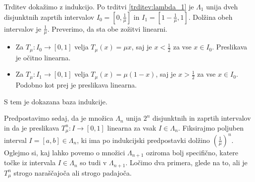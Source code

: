 \documentclass{isrmdelo}
\begin{document}
\begin{dokaz}
Trditev dokažimo z indukcijo. Po trditvi \ref{trditev:lambda_1} je $\Lambda_1$ unija dveh disjunktnih zaprtih intervalov $I_0 = [0, \frac{1}{\mu}]$ in $I_1 = [1-\frac{1}{\mu}, 1]$. Dolžina obeh intervalov je $\frac{1}{\mu}$. Preverimo, da sta obe zožitvi linearni.
\begin{itemize}
    \item Za $T_\mu: I_0 \rightarrow [0,1]$ velja $T_\mu(x) = \mu x$, saj je $x < \frac{1}{2}$ za vse $x \in I_0$. Preslikava je očitno linearna.
    \item Za $T_\mu: I_1 \rightarrow [0,1]$ velja $T_\mu(x) = \mu (1-x)$, saj je $x > \frac{1}{2}$ za vse $x \in I_0$. Podobno kot prej je preslikava linearna.
\end{itemize}
S tem je dokazana baza indukcije.

\bigskip

Predpostavimo sedaj, da je množica $\Lambda_n$ unija $2^n$ disjunktnih in zaprtih intervalov in da je preslikava $T_\mu^n: I \rightarrow [0,1]$ linearna za vsak $I \in \Lambda_n$. Fiksirajmo poljuben interval $I = [a,b] \in \Lambda_n$, ki ima po indukcijski predpostavki dolžino $(\frac{1}{\mu})^n$. Oglejmo si, kaj lahko povemo o množici $\Lambda_{n+1}$ oziroma bolj specifično, katere točke iz intervala $I \in \Lambda_n$ so tudi v $\Lambda_{n+1}$. Ločimo dva primera, glede na to, ali je $T_\mu^n$ strogo naraščajoča ali strogo padajoča.

\medskip


\end{dokaz}
\end{document}
